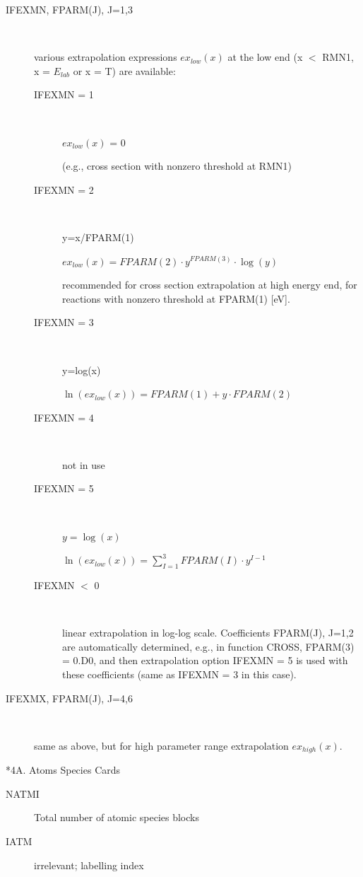 \begin{description}
  \item[IFEXMN, FPARM(J), J=1,3] ~

        various extrapolation expressions $ex_{low}(x)$ at the low end (x $<$ RMN1, x =
        $E_{lab}$ or x = T) are available:
        \begin{description}
          \item[IFEXMN = 1] ~

                $ex_{low}(x)$ = 0

                (e.g., cross section with nonzero threshold at RMN1)
          \item[IFEXMN = 2] ~

                y=x/FPARM(1)

                $ex_{low}(x) = FPARM(2) \cdot y^{FPARM(3)} \cdot \log(y)$

                recommended for cross section extrapolation at high energy end, for reactions
                with nonzero threshold at FPARM(1) [\si{\electronvolt}].
          \item[IFEXMN = 3] ~

                y=log(x)

                $\ln(ex_{low}(x)) = FPARM(1) + y \cdot FPARM(2) $
          \item[IFEXMN = 4] ~

                not in use
          \item[IFEXMN = 5] ~

                $y=\log(x)$

                $\ln(ex_{low}(x)) =\sum_{I=1}^3 FPARM(I) \cdot y^{I-1} $
          \item[IFEXMN $<$ 0] ~

                linear extrapolation in log-log scale.
                Coefficients FPARM(J), J=1,2 are automatically determined, e.g., in function
                CROSS, FPARM(3) = 0.D0, and then extrapolation option IFEXMN = 5 is used with
                these coefficients (same as IFEXMN = 3 in this case).
        \end{description}
  \item[IFEXMX, FPARM(J), J=4,6] ~

        same as above, but for high parameter range extrapolation $ex_{high}(x)$.

\end{description}

\medskip

*4A.
Atoms Species Cards
\begin{description}
  \item[NATMI] Total number of atomic
        species blocks
  \item[IATM] irrelevant; labelling index
\end{description}

